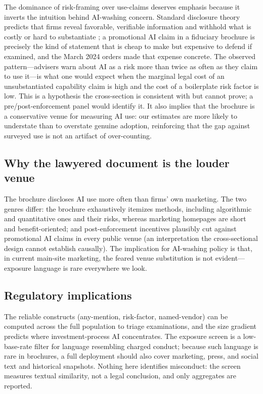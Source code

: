 \documentclass[utf8]{FrontiersinHarvard}
\begin{document}
The dominance of risk-framing over use-claims deserves emphasis because it inverts the intuition behind AI-washing concern. Standard disclosure theory predicts that firms reveal favorable, verifiable information and withhold what is costly or hard to substantiate \citep{verrecchia2001,healy2001}; a promotional AI claim in a fiduciary brochure is precisely the kind of statement that is cheap to make but expensive to defend if examined, and the March 2024 orders made that expense concrete. The observed pattern---advisers warn about AI as a risk more than twice as often as they claim to use it---is what one would expect when the marginal legal cost of an unsubstantiated capability claim is high and the cost of a boilerplate risk factor is low. This is a hypothesis the cross-section is consistent with but cannot prove; a pre/post-enforcement panel would identify it. It also implies that the brochure is a conservative venue for measuring AI use: our estimates are more likely to understate than to overstate genuine adoption, reinforcing that the gap against surveyed use is not an artifact of over-counting.

\subsection{Why the lawyered document is the louder venue}
The brochure discloses AI use more often than firms' own marketing. The two genres differ: the brochure exhaustively itemizes methods, including algorithmic and quantitative ones and their risks, whereas marketing homepages are short and benefit-oriented; and post-enforcement incentives plausibly cut against promotional AI claims in every public venue (an interpretation the cross-sectional design cannot establish causally). The implication for AI-washing policy is that, in current main-site marketing, the feared venue substitution is not evident---exposure language is rare everywhere we look.

\subsection{Regulatory implications}
The reliable constructs (any-mention, risk-factor, named-vendor) can be computed across the full population to triage examinations, and the size gradient predicts where investment-process AI concentrates. The exposure screen is a low-base-rate filter for language resembling charged conduct; because such language is rare in brochures, a full deployment should also cover marketing, press, and social text and historical snapshots. Nothing here identifies misconduct: the screen measures textual similarity, not a legal conclusion, and only aggregates are reported.
\end{document}
